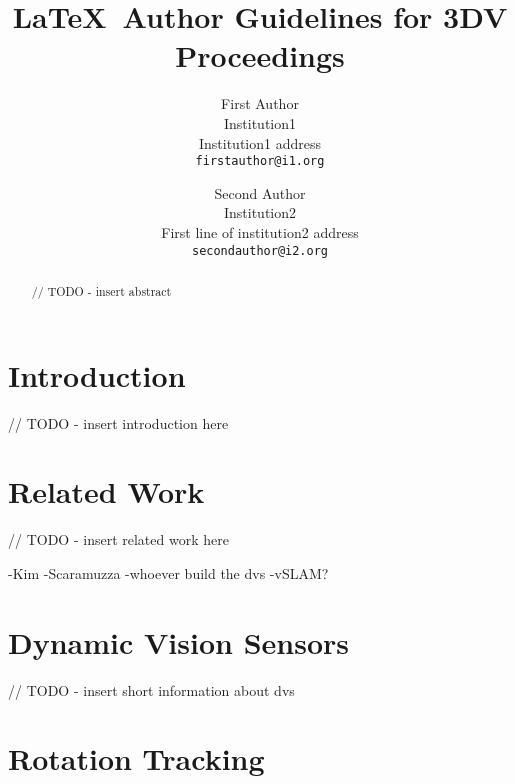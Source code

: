 \documentclass[10pt,twocolumn,letterpaper]{article}
\begin{document}
\title{\LaTeX\ Author Guidelines for 3DV Proceedings}

\author{First Author\\
Institution1\\
Institution1 address\\
{\tt\small firstauthor@i1.org}
\and
Second Author\\
Institution2\\
First line of institution2 address\\
{\tt\small secondauthor@i2.org}
}

\maketitle

\begin{abstract}

// TODO - insert abstract

\end{abstract}

\section{Introduction}

// TODO - insert introduction here

\section{Related Work}

// TODO - insert related work here

-Kim \etal
-Scaramuzza
-whoever build the dvs
-vSLAM?

\section{Dynamic Vision Sensors}

// TODO - insert short information about dvs

\section{Rotation Tracking}
\end{document}

